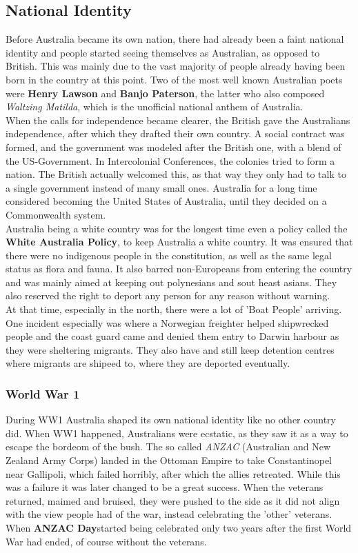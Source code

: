 \documentclass{article}
\begin{document}
	\subsection{National Identity}
	Before Australia became its own nation, there had already been a faint national identity and people started seeing themselves as Australian, as opposed to British. This was mainly due to the vast majority of people already having been born in the country at this point. Two of the most well known Australian poets were \textbf{Henry Lawson} and \textbf{Banjo Paterson}, the latter who also composed \textit{Waltzing Matilda}, which is the unofficial national anthem of Australia. \\
	When the calls for independence became clearer, the British gave the Australians independence, after which they drafted their own country. A social contract was formed, and the government was modeled after the British one, with a blend of the US-Government. In Intercolonial Conferences, the colonies tried to form a nation. The British actually welcomed this, as that way they only had to talk to a single government instead of many small ones. Australia for a long time considered becoming the United States of Australia, until they decided on a Commonwealth system. \\
	Australia being a white country was for the longest time even a policy called the \textbf{White Australia Policy}, to keep Australia a white country. It was ensured that there were no indigenous people in the constitution, as well as the same legal status as flora and fauna. It also barred non-Europeans from entering the country and was mainly aimed at keeping out polynesians and sout heast asians. They also reserved the right to deport any person for any reason without warning. \\
	At that time, especially in the north, there were a lot of 'Boat People' arriving. One incident especially was where a Norwegian freighter helped shipwrecked people and the coast guard came and denied them entry to Darwin harbour as they were sheltering migrants. They also have and still keep detention centres where migrants are shipeed to, where they are deported eventually. \\
	\subsubsection{World War 1}
	During WW1 Australia shaped its own national identity like no other country did. When WW1 happened, Australians were ecstatic, as they saw it as a way to escape the bordeom of the bush. The so called \textit{ANZAC} (Australian and New Zealand Army Corps) landed in the Ottoman Empire to take Constantinopel near Gallipoli, which failed horribly, after which the allies retreated. While this was a failure it was later changed to be a great success. When the veterans returned, maimed and bruised, they were pushed to the side as it did not align with the view people had of the war, instead celebrating the 'other' veterans. When \textbf{ANZAC Day}started being celebrated only two years after the first World War had ended, of course without the veterans. \\
\end{document}
